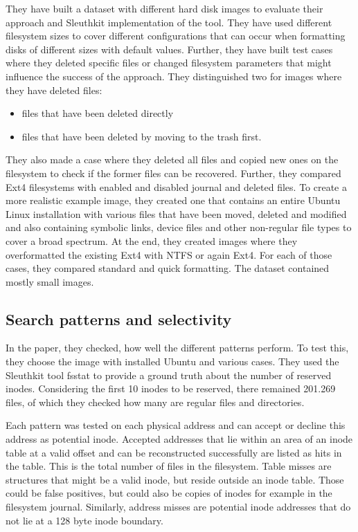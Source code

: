 \documentclass{acm_proc_article-sp}
\begin{document}
They have built a dataset with different hard disk images to evaluate their approach and Sleuthkit implementation of the tool. They have used different filesystem sizes to cover different configurations that can occur when formatting disks of different sizes with default values. 
Further, they have built test cases where they deleted specific files or changed filesystem parameters that might influence the success of the approach.
They distinguished two for images where they have deleted files:
\begin{itemize}
\item files that have been deleted directly
\item files that have been deleted by moving to the trash first.
\end{itemize}
They also made a case where they deleted all files and copied new ones on the filesystem to check if the former files can be recovered.
Further, they compared Ext4 filesystems with enabled and
disabled journal and deleted files. To create a more realistic
example image, they created one that contains an entire Ubuntu
Linux installation with various files that have been moved, deleted
and modified and also containing symbolic links, device files and
other non-regular file types to cover a broad spectrum.
At the end, they created images where they overformatted the existing Ext4 with NTFS or again Ext4. For each of those cases, they compared standard and quick formatting. The dataset contained mostly small images.

\subsection{Search patterns and selectivity}

In the paper, they checked, how well the different patterns perform. 
To test this, they choose the image with installed Ubuntu and various cases. They used the Sleuthkit tool fsstat to provide a ground truth about the number of reserved inodes.
Considering the first 10 inodes to be reserved, there remained 201.269 files, of which they checked how many are regular files and directories.

Each pattern was tested on each physical address and can accept or decline this address as potential inode. Accepted addresses that lie within an area of an inode table at a valid offset and can be reconstructed successfully are listed as hits in the table. This is the total number of files in the filesystem. Table misses are structures that might be a valid inode, but reside outside an inode table. Those could be false positives, but could also be copies of inodes for example in the filesystem journal. Similarly, address misses are potential inode addresses that do not lie at a 128 byte inode boundary.
\end{document}
